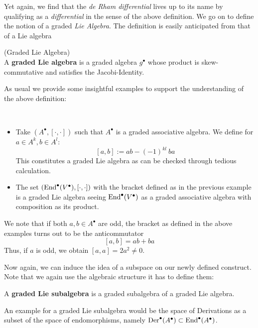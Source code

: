 Yet again, we find that the \emph{de Rham differential} lives up to its name by qualifying as a \emph{differential} in the sense of the above definition. We go on to define the notion of a graded \emph{Lie Algebra}. The definition is easily anticipated from that of a Lie algebra

\begin{definition} (Graded Lie Algebra)\\
  A \textbf{graded Lie algebra} is a graded algebra $g^\bullet$ whose product is skew-commutative and satisfies the Jacobi-Identity.
\end{definition}

As usual we provide some insightful examples to support the understanding of the above definition:

\begin{example}~
\begin{itemize}
  \item Take $(A^\bullet, [\cdot , \cdot ])$ such that $A^\bullet$ is a graded associative algebra. We define for $a \in A^k,b \in A^l$:
  $$ [a,b] := ab-(-1)^{kl} \ ba$$ This constitutes a graded Lie algebra as can be checked through tedious calculation.

  \item The set $(\operatorname{End}^\bullet(V^\bullet), [\cdot,\cdot])$ with the bracket defined as in the previous example is a graded Lie algebra seeing $\operatorname{End}^\bullet(V^\bullet)$ as a graded associative algebra with composition as its product.
\end{itemize}
\end{example}

\begin{rem}
  We note that if both $a,b \in A^\bullet$ are odd, the bracket as defined in the above examples turns out to be the anticommutator
  $$ [a,b] = ab+ba $$ Thus, if $a$ is odd, we obtain $[a,a] = 2a^2 \neq 0$.
\end{rem}

Now again, we can induce the idea of a subspace on our newly defined construct. Note that we again use the algebraic structure it has to define them:

\begin{definition}
  A \textbf{graded Lie subalgebra} is a graded subalgebra of a graded Lie algebra.
\end{definition}

An example for a graded Lie subalgebra would be the space of Derivations as a subset of the space of endomorphisms, namely $\operatorname{Der}^\bullet(A^\bullet) \subset \operatorname{End}^\bullet(A^\bullet)$.

